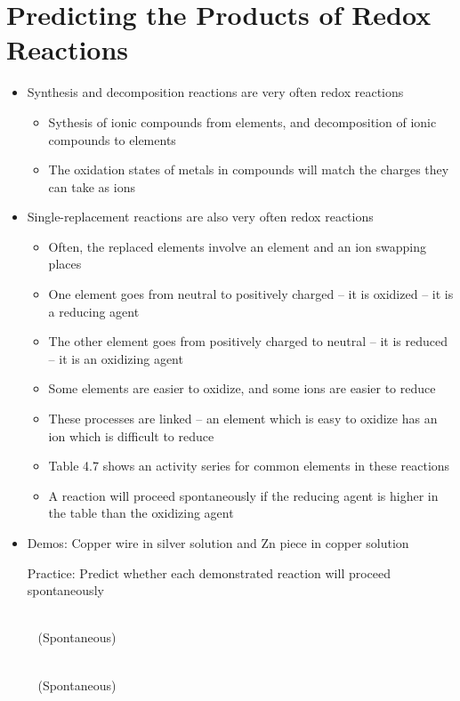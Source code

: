 \documentclass[12pt, openany, letterpaper]{memoir}
\begin{document}
\section{Predicting the Products of Redox Reactions}
\begin{itemize}
	\item Synthesis and decomposition reactions are very often redox reactions
	      \begin{itemize}
		      \item Sythesis of ionic compounds from elements, and decomposition of ionic compounds to elements
		      \item The oxidation states of metals in compounds will match the charges they can take as ions
	      \end{itemize}
	\item Single-replacement reactions are also very often redox reactions
	      \begin{itemize}
		      \item Often, the replaced elements involve an element and an ion swapping places
		      \item One element goes from neutral to positively charged -- it is oxidized -- it is a reducing agent
		      \item The other element goes from positively charged to neutral -- it is reduced -- it is an oxidizing agent
		      \item Some elements are easier to oxidize, and some ions are easier to reduce
		      \item These processes are linked -- an element which is easy to oxidize has an ion which is difficult to reduce
		      \item Table 4.7 shows an activity series for common elements in these reactions
		      \item A reaction will proceed spontaneously if the reducing agent is higher in the table than the oxidizing agent
	      \end{itemize}
	\item Demos: Copper wire in silver solution and Zn piece in copper solution

	      Practice: Predict whether each demonstrated reaction will proceed spontaneously

	      ~\hphantom{Practice:} \\
	      ~\hphantom{Practice: } (Spontaneous)

	      ~\hphantom{Practice:} \\
	      ~\hphantom{Practice: } (Spontaneous)
\end{itemize}
\end{document}
